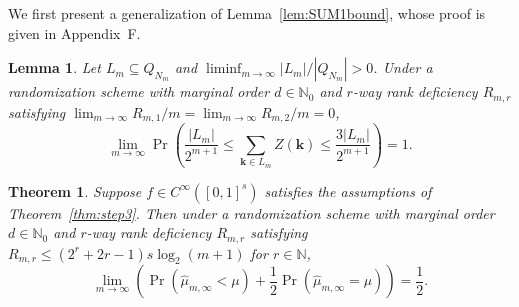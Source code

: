 \documentclass{article}
\newtheorem{theorem}{Theorem}
\newtheorem{lemma}{Lemma}
\theoremstyle{definition}
\renewcommand{\leq}{\leqslant}
\newcommand{\natu}{\mathbb{N}}
\newcommand{\bsk}{\boldsymbol{k}}
\newcommand{\appF}{F}
\begin{document}
We first present a generalization of Lemma~\ref{lem:SUM1bound}, whose proof is given in Appendix~\appF.

\begin{lemma}\label{lem:generalSUM1bound}
Let $L_m\subseteq Q_{N_m}$ and $\liminf_{m\to\infty} |L_m|/|Q_{N_m}|>0$.
Under a randomization scheme with marginal order $d\in \natu_0$ and $r$-way rank deficiency $R_{m,r}$ satisfying $\lim_{m\to\infty}R_{m,1}/m=\lim_{m\to\infty}R_{m,2}/m=0$,
 $$\lim_{m\to\infty}\Pr\left(\frac{|L_m|}{2^{m+1}}\leq \sum_{\bsk\in L_m}Z(\bsk)\leq \frac{3|L_m|}{2^{m+1}} \right)=1.$$
\end{lemma}

\begin{theorem}\label{thm:generalver}
    Suppose $f\in C^\infty([0,1]^s)$ satisfies the assumptions of Theorem~\ref{thm:step3}. Then under a randomization scheme with marginal order $d\in \natu_0$ and $r$-way rank deficiency $R_{m,r}$ satisfying $R_{m,r}\leq (2^r+2r-1) s \log_2(m+1)$ for $r\in\natu$,
    $$\lim_{m\to\infty}\left(\Pr(\hat{\mu}_{m,\infty}<\mu)+\frac{1}{2}\Pr(\hat{\mu}_{m,\infty}=\mu)\right)=\frac{1}{2}.$$
\end{theorem}
\end{document}
